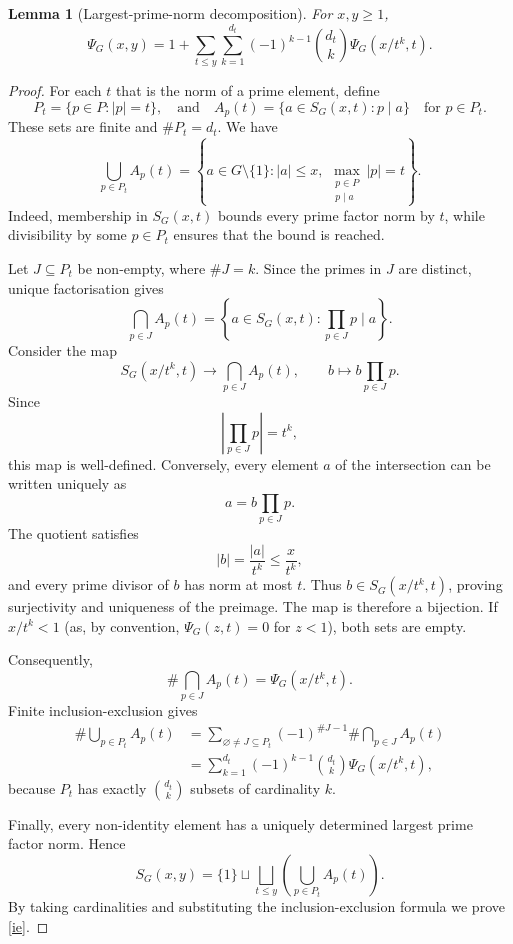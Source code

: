 \documentclass[a4paper]{amsart}
\newtheorem{lemma}[theorem]{Lemma}
\begin{document}
\begin{lemma}[Largest-prime-norm decomposition]\label{lem:ie}
For $x,y\ge1$,
\begin{equation}\label{ie}
\Psi_G(x,y)
=
1+\sum_{t\le y}\sum_{k=1}^{d_t}
(-1)^{k-1}\binom{d_t}{k}\Psi_G(x/t^k,t).
\end{equation}
\end{lemma}

\begin{proof}
For each $t$ that is the norm of a prime element, define
\[
P_t=\{p\in P:|p|=t\},
\quad \text{and} \quad 
A_p(t)=\{a\in S_G(x,t):p\mid a\}
\quad \text{for}\,\, p\in P_t.
\]
These sets are finite and $\#P_t=d_t$. We have
\[
\bigcup_{p\in P_t}A_p(t)
=
\left\{
a\in G\setminus\{1\}:|a|\le x,\ 
\max_{\substack{p\in P\\p\mid a}}|p|=t
\right\}.
\]
Indeed, membership in $S_G(x,t)$ bounds every prime factor
norm by $t$, while divisibility by some $p\in P_t$ ensures
that the bound is reached.

Let $J\subseteq P_t$ be non-empty, where $\#J=k$.
Since the primes in $J$ are distinct, unique factorisation
gives
\[
\bigcap_{p\in J}A_p(t)
=
\left\{
a\in S_G(x,t):
\prod_{p\in J}p\mid a
\right\}.
\]
Consider the map
\[
S_G(x/t^k,t)\longrightarrow\bigcap_{p\in J}A_p(t),
\qquad
b\longmapsto b\prod_{p\in J}p.
\]
Since
\[
\left|\prod_{p\in J}p\right|=t^k,
\]
this map is well-defined. Conversely, every element $a$
of the intersection can be written uniquely as
\[
a=b\prod_{p\in J}p.
\]
The quotient satisfies
\[
|b|=\frac{|a|}{t^k}\le\frac{x}{t^k},
\]
and every prime divisor of $b$ has norm at most $t$.
Thus $b\in S_G(x/t^k,t)$, proving surjectivity and
uniqueness of the preimage. The map is therefore a
bijection. If $x/t^k<1$ (as, by convention, $\Psi_G(z, t) = 0$ for $z < 1$), both sets are empty.

Consequently,
\[
\#\bigcap_{p\in J}A_p(t)=\Psi_G(x/t^k,t).
\]
Finite inclusion-exclusion gives
\begin{align*}
\#\bigcup_{p\in P_t}A_p(t)
&=
\sum_{\varnothing\ne J\subseteq P_t}
(-1)^{\#J-1}
\#\bigcap_{p\in J}A_p(t)\\
&=
\sum_{k=1}^{d_t}
(-1)^{k-1}\binom{d_t}{k}\Psi_G(x/t^k,t),
\end{align*}
because $P_t$ has exactly $\binom{d_t}{k}$ subsets
of cardinality $k$.

Finally, every non-identity element has a uniquely
determined largest prime factor norm. Hence
\[
S_G(x,y)
=
\{1\}\sqcup
\bigsqcup_{t\le y}
\left(\bigcup_{p\in P_t}A_p(t)\right).
\]
By taking cardinalities and substituting the
inclusion-exclusion formula we prove \eqref{ie}.
\end{proof}
\end{document}
